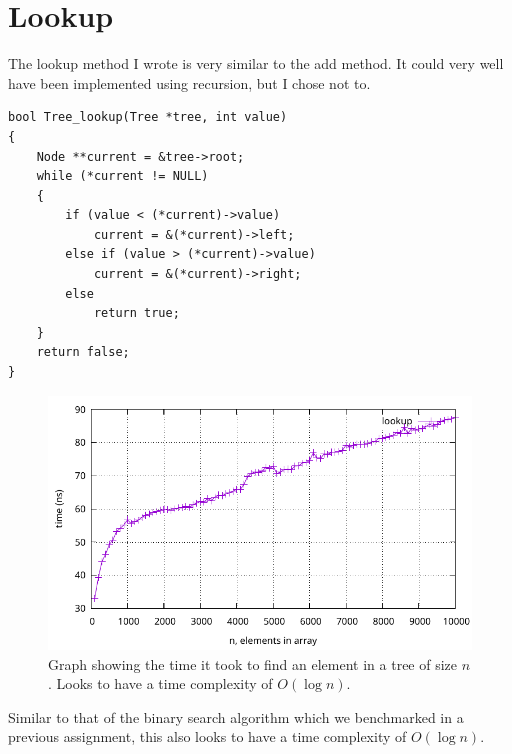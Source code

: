 \documentclass[a4paper, 11pt]{article}
\begin{document}
\section{Lookup}
	The lookup method I wrote is very similar to the add method.
	It could very well have been implemented using recursion, but I chose not to.
	\begin{verbatim}
bool Tree_lookup(Tree *tree, int value)
{
	Node **current = &tree->root;
	while (*current != NULL)
	{
		if (value < (*current)->value)
			current = &(*current)->left;
		else if (value > (*current)->value)
			current = &(*current)->right;
		else
			return true;
	}
	return false;
}
	\end{verbatim}
	\begin{figure}[H]
		\centering
		\includegraphics[scale=0.8]{graphs/lookup.pdf}
		\caption{
			Graph showing the time it took to find an element in a tree of size \(n\).
			Looks to have a time complexity of \(O(\log n)\).
		}
	\end{figure}
	Similar to that of the binary search algorithm which we benchmarked in a previous assignment,
	this also looks to have a time complexity of \(O(\log n)\).
\end{document}
